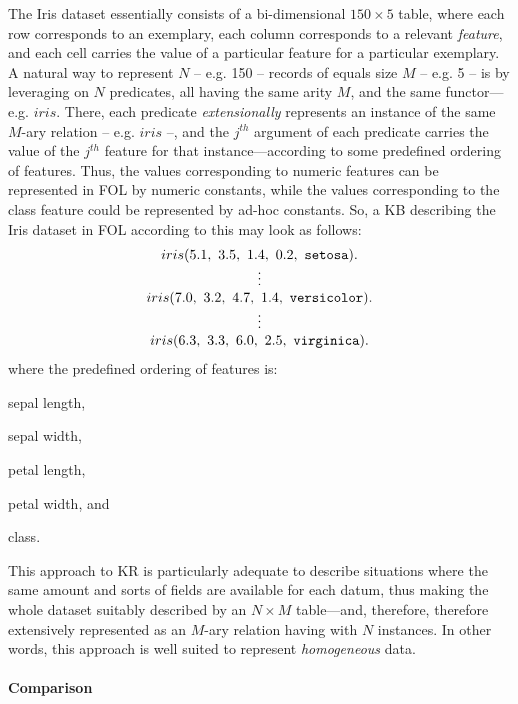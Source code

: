 \documentclass[12pt,a4paper,openright,twoside]{book}
\begin{document}
The Iris dataset essentially consists of a bi-dimensional $150 \times 5$ table, where each row corresponds to an exemplary, each column corresponds to a relevant \emph{feature}, and each cell carries the value of a particular feature for a particular exemplary.
%
A natural way to represent $N$ -- e.g. 150 -- records of equals size $M$ -- e.g. 5 -- is by leveraging on $N$ predicates, all having the same arity $M$, and the same functor---e.g. $iris$.
%
There, each predicate \emph{extensionally} represents an instance of the same $M$-ary relation -- e.g. $iris$ --, and the $j^{th}$ argument of each predicate carries the value of the $j^{th}$ feature for that instance---according to some predefined ordering of features.
%
Thus, the values corresponding to numeric features can be represented in FOL by numeric constants, while the values corresponding to the class feature could be represented by ad-hoc constants.
%
So, a KB describing the Iris dataset in FOL according to this may look as follows:
%
\begin{equation}
    \begin{array}{c}
        iris(5.1,\ 3.5,\ 1.4,\ 0.2,\ \mathtt{setosa}).
        \\\vdots\\
        iris(7.0,\ 3.2,\ 4.7,\ 1.4,\ \mathtt{versicolor}).
        \\\vdots\\
        iris(6.3,\ 3.3,\ 6.0,\ 2.5,\ \mathtt{virginica}).
    \end{array}
\end{equation}
%
where the predefined ordering of features is:
%
\begin{inlinelist}
    \item sepal length,
    \item sepal width,
    \item petal length,
    \item petal width, and
    \item class.
\end{inlinelist}

This approach to KR is particularly adequate to describe situations where the same amount and sorts of fields are available for each datum, thus making the whole dataset suitably described by an $N \times M$ table---and, therefore, therefore extensively represented as an $M$-ary relation having with $N$ instances.
%
In other words, this approach is well suited to represent \emph{homogeneous} data.

\paragraph{Comparison}
\end{document}
